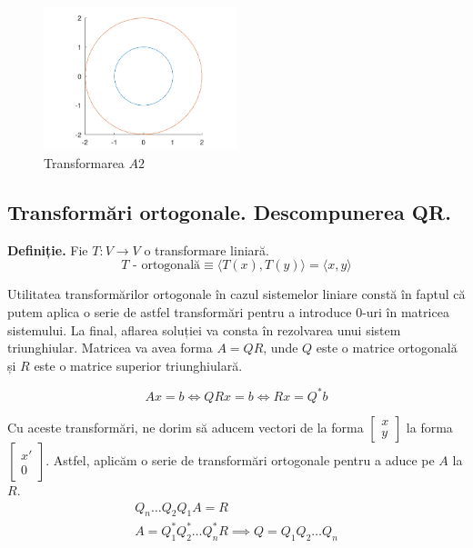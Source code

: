 \documentclass{exam}
\begin{document}
\begin{figure}[ht]
	\centering
	\includegraphics[width=0.5\textwidth]{plot4}
	\caption{Transformarea $A2$}
	\label{fig:4}
\end{figure}

\subsection{Transformări ortogonale. Descompunerea QR.}

\textbf{Definiție.} Fie $T: V \rightarrow V$ o transformare liniară.
\begin{equation*}
	T \text{ - ortogonală} \equiv \langle T(x), T(y) \rangle = \langle x, y \rangle
\end{equation*}

Utilitatea transformărilor ortogonale în cazul sistemelor liniare constă în
faptul că putem aplica o serie de astfel transformări pentru a introduce 0-uri
în matricea sistemului. La final, aflarea soluției va consta în rezolvarea unui
sistem triunghiular. Matricea va avea forma $A = QR$, unde $Q$ este o matrice
ortogonală și $R$ este o matrice superior triunghiulară.

\begin{equation*}
	Ax = b \Leftrightarrow QRx = b \Leftrightarrow Rx = Q^*b
\end{equation*}

Cu aceste transformări, ne dorim să aducem vectori de la forma
$\begin{bmatrix} x \\ y \end{bmatrix}$ la forma
$\begin{bmatrix} x' \\ 0 \end{bmatrix}$. Astfel, aplicăm o serie de
transformări ortogonale pentru a aduce pe $A$ la $R$.
\begin{gather*}
	Q_n \ldots Q_2 Q_1 A = R \\
	A = Q_1^* Q_2^* \ldots Q_n^* R \implies Q = Q_1 Q_2 \ldots Q_n
\end{gather*}
\end{document}
